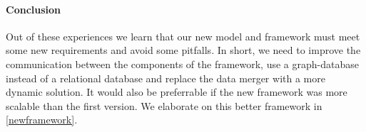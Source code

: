\paragraph{Conclusion} Out of these experiences we learn that our new model and framework must meet some new requirements and avoid some pitfalls. In short, we need to improve the communication between the components of the framework, use a graph-database instead of a relational database and replace the data merger with a more dynamic solution. It would also be preferrable if the new framework was more scalable than the first version. We elaborate on this better framework in \autoref{newframework}.
